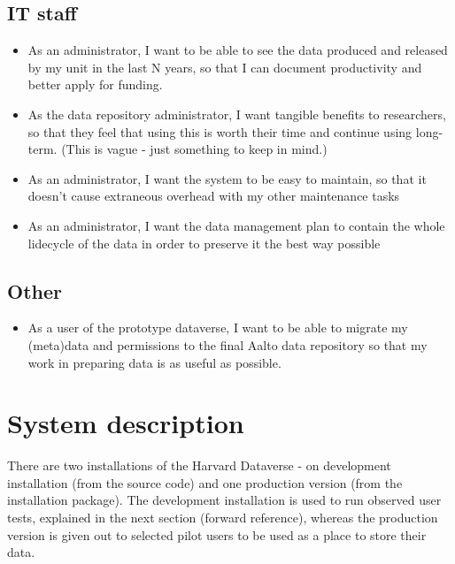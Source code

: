 \subsection{IT staff}

\begin{itemize}
    \item As an administrator, I want to be able to see the data produced and
          released by my unit in the last N years, so that I can document
          productivity and better apply for funding.
    \item As the data repository administrator, I want tangible benefits to
          researchers, so that they feel that using this is worth their time and
          continue using long-term.  (This is vague - just something to keep in
          mind.)
    \item As an administrator, I want the system to be easy to maintain, so
          that it doesn't cause extraneous overhead with my other maintenance
          tasks
    \item As an administrator, I want the data management plan to contain the
          whole lidecycle of the data in order to preserve it the best way
          possible
\end{itemize}

\subsection{Other}

\begin{itemize}
    \item As a user of the prototype dataverse, I want to be able to migrate my
          (meta)data and permissions to the final Aalto data repository so that
          my work in preparing data is as useful as possible.
\end{itemize}

\section{System description}
\label{sec:system_description}

There are two installations of the Harvard Dataverse - on development
installation (from the source code) and one production version (from the
installation package). The development installation is used to run observed
user tests, explained in the next section (forward reference), whereas the
production version is given out to selected pilot users to be used as a place
to store their data.

